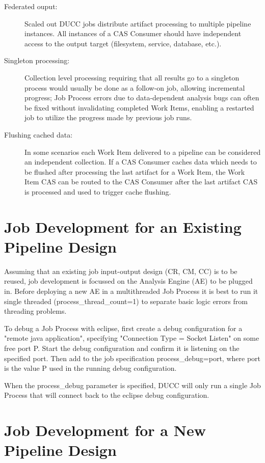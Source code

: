 	\begin{description}
	    \item[Federated ouput:] Scaled out DUCC jobs distribute artifact processing
	    to multiple pipeline instances. All instances of a CAS Consumer should have
	    independent access to the output target (filesystem, service, database, etc.).
	    \item[Singleton processing:] Collection level processing
	    requiring that all results go to a singleton process would usually be done as a 
            follow-on job, allowing
	    incremental progress; Job Process errors due to data-dependent analysis bugs
	    can often be fixed without invalidating completed Work Items, 
            enabling a restarted job to utilize the progress made by
	    previous job runs.
	    \item[Flushing cached data:] In some scenarios each Work Item delivered to a
	    pipeline can be considered an independent collection. If a CAS Consumer
	    caches data which needs to be flushed after processing the
	    last artifact for a Work Item, the Work Item CAS can be routed to the CAS Consumer after
	    the last artifact CAS is processed and used to trigger cache flushing.
	\end{description}


\section{Job Development for an Existing Pipeline Design}

Assuming that an existing job input-output design (CR, CM, CC) is to be reused, job
development is focussed on the Analysis Engine (AE) to be plugged in. Before deploying a new
AE in a multithreaded Job Process it is best to run it single threaded
(process\_thread\_count=1) to separate basic logic errors from threading
problems.

To debug a Job Process with eclipse, first create a debug configuration for a
"remote java application", specifying "Connection Type = Socket Listen" on some
free port P. Start the debug configuration and confirm it is listening on the specified port.
Then add to the job specification
process\_debug=port, where port is the value P used in the running debug configuration.

When the process\_debug parameter is specified, DUCC will only run a single Job Process
that will connect back to the eclipse debug configuration.


\section{Job Development for a New Pipeline Design}

